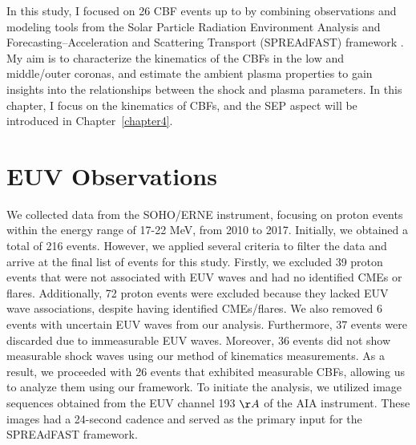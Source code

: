In this study, I focused on 26 CBF events up to \rsun by combining observations and modeling tools from the Solar Particle Radiation Environment Analysis and Forecasting--Acceleration and Scattering Transport (SPREAdFAST) framework \citep{kozarev_2022}. My aim is to characterize the kinematics of the CBFs in the low and middle/outer coronas, and estimate the ambient plasma properties to gain insights into the relationships between the shock and plasma parameters.
In this chapter, I focus on the kinematics of CBFs, and the SEP aspect will be introduced in Chapter~\ref{chapter4}.

\section{EUV Observations}
We collected data from the SOHO/ERNE instrument, focusing on proton events within the energy range of 17-22 MeV, from 2010 to 2017. Initially, we obtained a total of 216 events. However, we applied several criteria to filter the data and arrive at the final list of events for this study.
Firstly, we excluded 39 proton events that were not associated with EUV waves and had no identified CMEs or flares. Additionally, 72 proton events were excluded because they lacked EUV wave associations, despite having identified CMEs/flares. We also removed 6 events with uncertain EUV waves from our analysis. Furthermore, 37 events were discarded due to immeasurable EUV waves.
Moreover, 36 events did not show measurable shock waves using our method of kinematics measurements. As a result, we proceeded with 26 events that exhibited measurable CBFs, allowing us to analyze them using our framework.
To initiate the analysis, we utilized image sequences obtained from the EUV channel 193 $\AA$ of the AIA instrument. These images had a 24-second cadence and served as the primary input for the SPREAdFAST framework.

